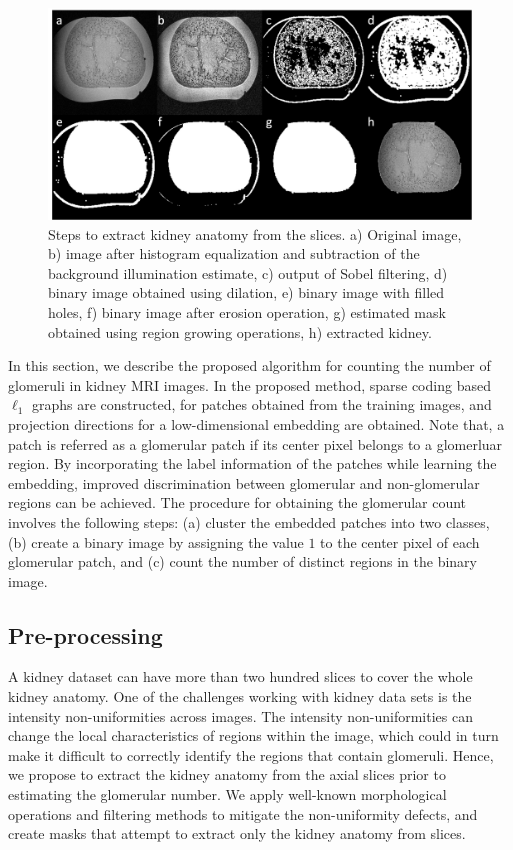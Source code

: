 \begin{figure}[t]
\begin{minipage}[b]{0.99\linewidth}
  \centering
  \includegraphics[width=15cm]{group_pic.png}
\end{minipage}
\caption{Steps to extract kidney anatomy from the slices. a) Original image, b) image after histogram equalization and subtraction of the background illumination estimate, c) output of Sobel filtering, d) binary image obtained using dilation, e) binary image with filled holes, f) binary image after erosion operation, g) estimated mask obtained using region growing operations, h) extracted kidney. }
\label{Fig:preprocessing}
\end{figure}
In this section, we describe the proposed algorithm for counting the number of glomeruli in kidney MRI images. In the proposed method, sparse coding based $\ell_1$ graphs are constructed, for patches obtained from the training images, and  projection directions for a low-dimensional embedding are obtained. Note that, a patch is referred as a glomerular patch if its center pixel belongs to a glomerluar region. By incorporating the label information of the patches while learning the embedding, improved discrimination between glomerular and non-glomerular regions can be achieved. The procedure for obtaining the glomerular count involves the following steps: (a) cluster the embedded patches into two classes, (b) create a binary image by assigning the value $1$ to the center pixel of each glomerular patch, and (c) count the number of distinct regions in the binary image.

\subsection{Pre-processing}
A kidney dataset can have more than two hundred slices to cover the whole kidney anatomy. One of the challenges working with kidney data sets is the intensity non-uniformities across images. The intensity non-uniformities can change the local characteristics of regions within the image, which could in turn make it difficult to correctly identify the regions that contain glomeruli. Hence, we propose to extract the kidney anatomy from the axial slices prior to estimating the glomerular number. We apply well-known morphological operations and filtering methods to mitigate the non-uniformity defects, and create masks that attempt to extract only the kidney anatomy from slices. 

